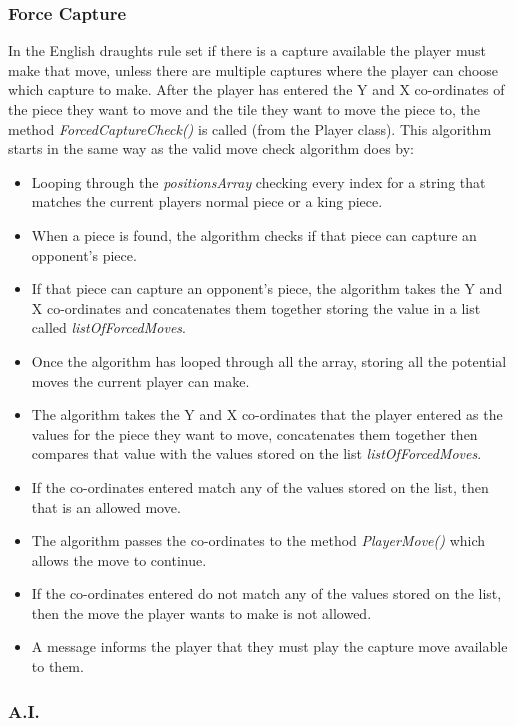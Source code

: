 \documentclass[10pt, a4paper]{article}
\begin{document}
 
 
 
 \subsubsection{Force Capture} 
 In the English draughts rule set if there is a capture available the player must make that move, unless there are multiple captures where the player can choose which capture to make. After the player has entered the Y and X co-ordinates of the piece they want to move and the tile they want to move the piece to, the method \textit{ForcedCaptureCheck()} is called (from the Player class).
 \newline
 This algorithm starts in the same way as the valid move check algorithm does by:    
 
 \begin{itemize}
 	\item Looping through the \textit{positionsArray} checking every index for a string that matches the current players normal piece or a king piece.
 	\item When a piece is found, the algorithm checks if that piece can capture an opponent's piece.
 	\item If that piece can capture an opponent's piece, the algorithm takes the Y and X co-ordinates and concatenates them together storing the value in a list called \textit{listOfForcedMoves}.
 	\item Once the algorithm has looped through all the array, storing all the potential moves the current player can make.
 	\item The algorithm takes the Y and X co-ordinates that the player entered as the values for the piece they want to move, concatenates them together then compares that value with the values stored on the list \textit{listOfForcedMoves}.
 	\item If the co-ordinates entered match any of the values stored on the list, then that is an allowed move.
 	\item The algorithm passes the co-ordinates to the method \textit{PlayerMove()} which allows the move to continue.
 	\item If the co-ordinates entered do not match any of the values stored on the list, then the move the player wants to make is not allowed.
 	\item A message informs the player that they must play the capture move available to them.
 \end{itemize} 
 
 
 \subsubsection{A.I.}    	
 
\end{document}
